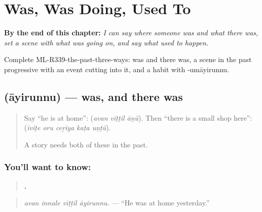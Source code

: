 
\chapter{Was, Was Doing, Used To}
\label{ch:ml-was-was-doing-used-to}

\begin{chapteropening}
\textbf{By the end of this chapter:} \emph{I can say where someone was and what there was, set a scene with what was going on, and say what used to happen.}

Complete ML-R339-the-past-three-ways: was and there was, a scene in the past progressive with an event cutting into it, and a habit with -umāyirunnu.
\end{chapteropening}

\section[\texorpdfstring{\ml{ആയിരുന്നു} (āyirunnu)}{ആയിരുന്നു (āyirunnu)}]{ (āyirunnu) — was, and there was}

\label{lesson:ML-C339-ayirunnu}



\begin{quote}
Say \textquotedblleft{}he is at home\textquotedblright{}: \textbf{  } (\emph{avan vīṭṭil āṇŭ}). Then \textquotedblleft{}there is a small shop here\textquotedblright{}: \textbf{    } (\emph{iviṭe oru ceṟiya kaṭa uṇṭŭ}).

A story needs both of these in the past.
\end{quote}

\subsection*{You'll want to know: }
\begin{quote}
\textbf{   .}
\end{quote}

\begin{quote}
\emph{avan innale vīṭṭil āyirunnu.} — \textquotedblleft{}He was at home yesterday.\textquotedblright{}
\end{quote}

